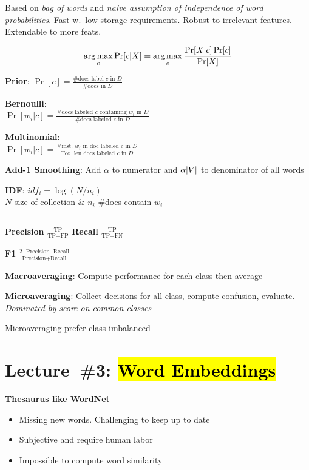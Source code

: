 \documentclass[8pt]{extarticle}
\renewcommand{\green}[1]{{\color{ForestGreen} #1}}
\newcommand{\greenbf}[1]{\textbf{\green{#1}}}
\begin{document}
\begin{multicols}{3}
  Based on \textit{bag of words} and \textit{naive assumption of independence of word probabilities}. Fast w.\ low storage requirements. Robust to irrelevant features. Extendable to more feats.

  \begin{equation*}\label{eq:L02:NaiveBayes}
    \operatorname*{arg\,max}_c \Pr\lbrack c \vert X\rbrack = \operatorname*{arg\,max}_{c} \frac{\Pr[X \vert c] \Pr[c]}{\Pr[X]}
  \end{equation*}

  \greenbf{Prior}: $\Pr[c] = \frac{\text{\#docs label } c \text{ in } D}{\text{\#docs in } D}$

  \greenbf{Bernoulli}: \\ $\Pr[w_ i \vert c] = \frac{\text{\# docs labeled } c \text{ containing } w_i \text{ in } D}{\text{\#docs labeled } c \text{ in } D}$

  \greenbf{Multinomial}: \\ $\Pr[w_i \vert c] = \frac{\text{\# inst.\ } w_i \text{ in doc labeled } c \text{ in } D}{\text{Tot.\ len docs labeled } c \text{ in } D}$

  \greenbf{Add-1 Smoothing}: Add $\alpha$ to numerator and $\alpha\lvert V\rvert$ to denominator of all words

  \greenbf{IDF}: $idf_i = \log \left(N/n_i\right)$ \\ $N$ size of collection \& $n_i$ \#docs contain $w_i$

  \subsection*{}

  \greenbf{Precision} $\frac{\text{TP}}{\text{TP} + \text{FP}}$ \hspace{0.1cm} \greenbf{Recall} $\frac{\text{TP}}{\text{TP} + \text{FN}}$

  \greenbf{F1} $\frac{2 \cdot \text{Precision} \cdot \text{Recall}}{\text{Precision} + \text{Recall}}$

  \greenbf{Macroaveraging}: Compute performance for each class then average

  \greenbf{Microaveraging}: Collect decisions for all class, compute confusion, evaluate. \textit{Dominated by score on common classes}

  Microaveraging prefer class imbalanced

  \section*{Lecture~\#3: \hl{Word Embeddings}}
  \textbf{Thesaurus like WordNet}
  \begin{itemize}
    \item Missing new words. Challenging to keep up to date
    \item Subjective and require human labor
    \item Impossible to compute word similarity
  \end{itemize}


\end{multicols}
\end{document}
